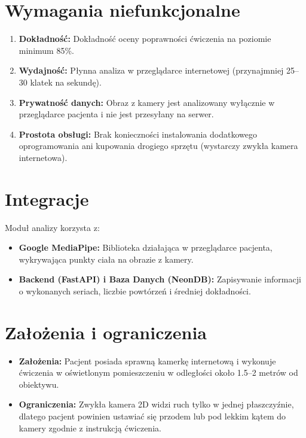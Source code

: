\documentclass[11pt,a4paper]{article}
\begin{document}
\section{Wymagania niefunkcjonalne}
\begin{enumerate}
    \item \textbf{Dokładność:} Dokładność oceny poprawności ćwiczenia na poziomie minimum 85\%.
    \item \textbf{Wydajność:} Płynna analiza w przeglądarce internetowej (przynajmniej 25--30 klatek na sekundę).
    \item \textbf{Prywatność danych:} Obraz z kamery jest analizowany wyłącznie w przeglądarce pacjenta i nie jest przesyłany na serwer.
    \item \textbf{Prostota obsługi:} Brak konieczności instalowania dodatkowego oprogramowania ani kupowania drogiego sprzętu (wystarczy zwykła kamera internetowa).
\end{enumerate}

\section{Integracje}
Moduł analizy korzysta z:
\begin{itemize}
    \item \textbf{Google MediaPipe:} Biblioteka działająca w przeglądarce pacjenta, wykrywająca punkty ciała na obrazie z kamery.
    \item \textbf{Backend (FastAPI) i Baza Danych (NeonDB):} Zapisywanie informacji o wykonanych seriach, liczbie powtórzeń i średniej dokładności.
\end{itemize}

\section{Założenia i ograniczenia}
\begin{itemize}
    \item \textbf{Założenia:} Pacjent posiada sprawną kamerkę internetową i wykonuje ćwiczenia w oświetlonym pomieszczeniu w odległości około 1.5--2 metrów od obiektywu.
    \item \textbf{Ograniczenia:} Zwykła kamera 2D widzi ruch tylko w jednej płaszczyźnie, dlatego pacjent powinien ustawiać się przodem lub pod lekkim kątem do kamery zgodnie z instrukcją ćwiczenia.
\end{itemize}
\end{document}
